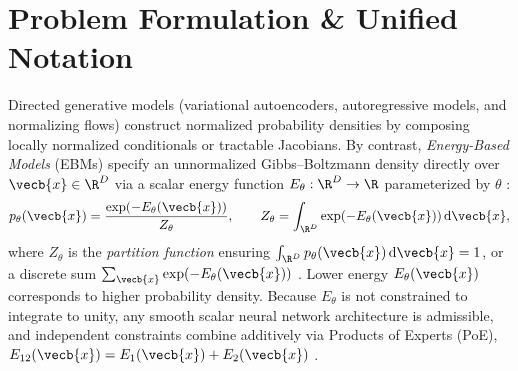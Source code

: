 \documentclass[../../../../master.tex]{subfiles}
\begin{document}

\section{Problem Formulation \& Unified Notation}
\label{sec:ebm:formulation}

Directed generative models (variational autoencoders, autoregressive models, and normalizing flows) construct normalized probability densities by composing locally normalized conditionals or tractable Jacobians. By contrast, \emph{Energy-Based Models} (EBMs) specify an unnormalized Gibbs--Boltzmann density directly over $\vecb{x} \in \R^D$ via a scalar energy function $E_\theta : \R^D \to \R$ parameterized by $\theta$ :
\begin{equation}
  p_\theta(\vecb{x}) = \frac{\exp(-E_\theta(\vecb{x}))}{Z_\theta}, \qquad Z_\theta = \int_{\R^D} \exp(-E_\theta(\vecb{x})) \, \mathrm{d}\vecb{x},
  \label{eq:ebm:gibbs}
\end{equation}
where $Z_\theta$ is the \emph{partition function} ensuring $\int_{\R^D} p_\theta(\vecb{x})\,\mathrm{d}\vecb{x} = 1$, or a discrete sum $\sum_{\vecb{x}} \exp(-E_\theta(\vecb{x}))$ . Lower energy $E_\theta(\vecb{x})$ corresponds to higher probability density. Because $E_\theta$ is not constrained to integrate to unity, any smooth scalar neural network architecture is admissible, and independent constraints combine additively via Products of Experts (PoE), $E_{12}(\vecb{x}) = E_1(\vecb{x}) + E_2(\vecb{x})$ .
\end{document}
